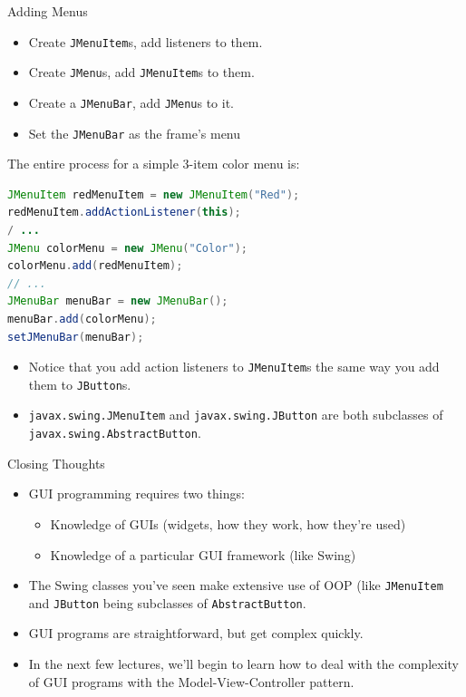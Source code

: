 \documentclass{beamer}
\begin{document}
\begin{frame}[fragile]{Adding Menus}

\vspace{-.05in}
\begin{itemize}
\item Create {\tt JMenuItem}s, add listeners to them.
\item Create {\tt JMenu}s, add {\tt JMenuItem}s to them.
\item Create a {\tt JMenuBar}, add {\tt JMenu}s to it.
\item Set the {\tt JMenuBar} as the frame's menu
\end{itemize}
The entire process for a simple 3-item color menu is:
\vspace{-.05in}
\begin{lstlisting}[language=Java]
JMenuItem redMenuItem = new JMenuItem("Red");
redMenuItem.addActionListener(this);
/ ...
JMenu colorMenu = new JMenu("Color");
colorMenu.add(redMenuItem);
// ...
JMenuBar menuBar = new JMenuBar();
menuBar.add(colorMenu);
setJMenuBar(menuBar);
\end{lstlisting}
\vspace{-.1in}
\begin{itemize}
\item Notice that you add action listeners to {\tt JMenuItem}s the same way you add them to {\tt JButton}s.
\item {\tt javax.swing.JMenuItem} and {\tt javax.swing.JButton} are both subclasses of {\tt javax.swing.AbstractButton}.  
\end{itemize}
\end{frame}

\begin{frame}[fragile]{Closing Thoughts}


\begin{itemize}
\item GUI programming requires two things:
\begin{itemize}
  \item Knowledge of GUIs (widgets, how they work, how they're used)
  \item Knowledge of a particular GUI framework (like Swing)
\end{itemize}
\item The Swing classes you've seen make extensive use of OOP (like {\tt JMenuItem} and {\tt JButton} being subclasses of {\tt AbstractButton}.
\item GUI programs are straightforward, but get complex quickly.
\item In the next few lectures, we'll begin to learn how to deal with the complexity of GUI programs with the Model-View-Controller pattern.
\end{itemize}


\end{frame}
\end{document}
